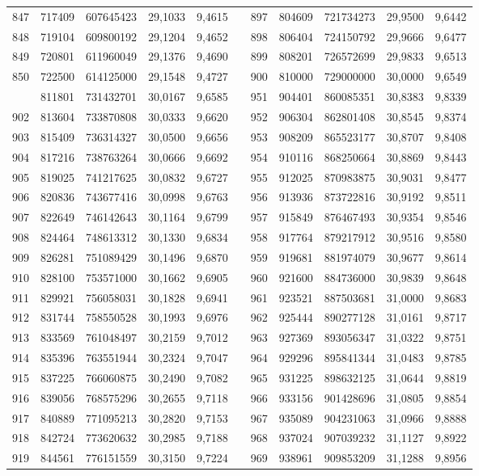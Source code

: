 \begin{longtable}{rrrrrrrrrrr}
847&717409&607645423&29,1033&9,4615&&897&804609&721734273&29,9500&9,6442\\
848&719104&609800192&29,1204&9,4652&&898&806404&724150792&29,9666&9,6477\\
849&720801&611960049&29,1376&9,4690&&899&808201&726572699&29,9833&9,6513\\
850&722500&614125000&29,1548&9,4727&&900&810000&729000000&30,0000&9,6549\\
\newpage
901&811801&731432701&30,0167&9,6585&&951&904401&860085351&30,8383&9,8339\\
902&813604&733870808&30,0333&9,6620&&952&906304&862801408&30,8545&9,8374\\
903&815409&736314327&30,0500&9,6656&&953&908209&865523177&30,8707&9,8408\\
904&817216&738763264&30,0666&9,6692&&954&910116&868250664&30,8869&9,8443\\
905&819025&741217625&30,0832&9,6727&&955&912025&870983875&30,9031&9,8477\\
906&820836&743677416&30,0998&9,6763&&956&913936&873722816&30,9192&9,8511\\
907&822649&746142643&30,1164&9,6799&&957&915849&876467493&30,9354&9,8546\\
908&824464&748613312&30,1330&9,6834&&958&917764&879217912&30,9516&9,8580\\
909&826281&751089429&30,1496&9,6870&&959&919681&881974079&30,9677&9,8614\\
910&828100&753571000&30,1662&9,6905&&960&921600&884736000&30,9839&9,8648\\
911&829921&756058031&30,1828&9,6941&&961&923521&887503681&31,0000&9,8683\\
912&831744&758550528&30,1993&9,6976&&962&925444&890277128&31,0161&9,8717\\
913&833569&761048497&30,2159&9,7012&&963&927369&893056347&31,0322&9,8751\\
914&835396&763551944&30,2324&9,7047&&964&929296&895841344&31,0483&9,8785\\
915&837225&766060875&30,2490&9,7082&&965&931225&898632125&31,0644&9,8819\\
916&839056&768575296&30,2655&9,7118&&966&933156&901428696&31,0805&9,8854\\
917&840889&771095213&30,2820&9,7153&&967&935089&904231063&31,0966&9,8888\\
918&842724&773620632&30,2985&9,7188&&968&937024&907039232&31,1127&9,8922\\
919&844561&776151559&30,3150&9,7224&&969&938961&909853209&31,1288&9,8956\\

\end{longtable}
